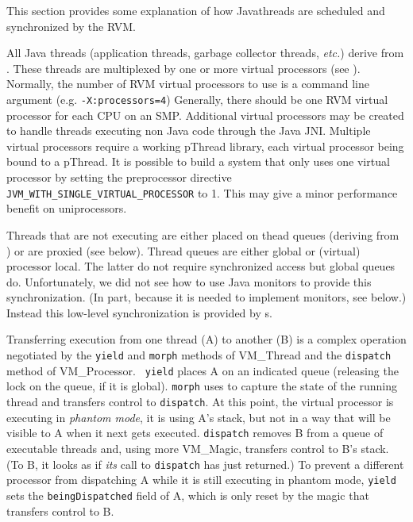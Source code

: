 This section provides some explanation of how Java\trademark threads are
scheduled and synchronized by the RVM.


All Java threads (application threads, garbage collector threads, {\em
etc.})  derive from 
.  
These threads are multiplexed by
one or more virtual processors (see 
).  Normally, the
number of RVM virtual processors to use is a command line argument
(e.g. {\tt -X:processors=4}) Generally, there should be one RVM
virtual processor for each CPU on an SMP.  Additional virtual
processors may be created to handle threads executing non Java code
through the Java JNI.  Multiple virtual processors require a working
pThread library, each virtual processor being bound to a pThread.  It
is possible to build a system that only uses one virtual processor by
setting the preprocessor directive {\tt
JVM\_WITH\_SINGLE\_VIRTUAL\_PROCESSOR} to 1.  This may give a minor
performance benefit on uniprocessors.

Threads that are not executing are either placed on thead queues
(deriving from 
) or are proxied (see below).
Thread queues are either global or (virtual) processor local.  The
latter do not require synchronized access but global queues do.
Unfortunately, we did not see how to use Java monitors to provide
this synchronization.  (In part, because it is needed to implement
monitors, see below.)  Instead this low-level synchronization is
provided by 
s.

Transferring execution from one thread (A) to another (B) is a complex
operation negotiated by the {\tt yield} and {\tt morph} methods of
VM\_Thread and the {\tt dispatch} method of VM\_Processor.  {\tt
yield} places A on an indicated queue (releasing the lock on the
queue, if it is global).  {\tt morph} uses 
to capture the
state of the running thread and transfers control to {\tt dispatch}.
At this point, the virtual processor is executing in {\em phantom
mode}, it is using A's stack, but not in a way that will be visible to
A when it next gets executed.  {\tt dispatch} removes B from a queue
of executable threads and, using more VM\_Magic, transfers control
to B's stack.  (To B, it looks as if {\em its} call to {\tt dispatch}
has just returned.)  To prevent a different processor from dispatching
A while it is still executing in phantom mode, {\tt yield} sets the
{\tt beingDispatched} field of A, which is only reset by the magic
that transfers control to B.

